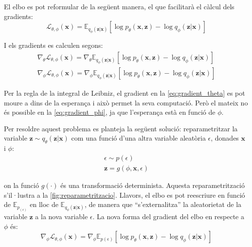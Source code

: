 \documentclass[CAT,BIB]{TFUOC}%
\begin{document}
        El \gls{elbo} es pot reformular de la següent manera,
        el que facilitarà el càlcul dels gradients:
        \begin{equation}
        \label{eq:elbo_2}
            \mathcal{L}_{\theta,\phi}(\mathbf{x}) =
            \mathbb{E}_{q_\phi(\mathbf{z|x})} [
                \log p_\theta(\mathbf{x,z}) -
                \log q_\phi(\mathbf{z|x})
            ]
        \end{equation}

        I els gradients es calculen segons:
        \begin{gather}
        \label{eq:gradient_theta}
            \nabla_\theta \mathcal{L}_{\theta,\phi}(\mathbf{x}) =
            \nabla_\theta \mathbb{E}_{q_\phi(\mathbf{z|x})} [
            \log p_\theta(\mathbf{x,z}) -
            \log q_\phi(\mathbf{z|x})
            ]
        \\
        \label{eq:gradient_phi}
            \nabla_\phi \mathcal{L}_{\theta,\phi}(\mathbf{x}) =
            \nabla_\phi \mathbb{E}_{q_\phi(\mathbf{z|x})} [
            \log p_\theta(\mathbf{x,z}) -
            \log q_\phi(\mathbf{z|x})
            ]
        \end{gather}

        Per la regla de la integral de Leibniz, el gradient en la \cref{eq:gradient_theta} es pot moure a dins de la esperança i això permet la seva computació. Però el mateix no és possible en la \cref{eq:gradient_phi}, ja que l'esperança està en funció de $\phi$.

        Per resoldre aquest problema es planteja la següent solució:
        reparametritzar la variable $\mathbf{z} \sim q_\theta(\mathbf{z|x})$
        com una funció d'una altra variable aleatòria $\epsilon$, donades $\mathbf{x}$ i $\phi$:
        \begin{gather}
        \label{eq:epsilon}
            \epsilon \sim p(\epsilon) \\
        \label{eq:z_reparam}
            \mathbf{z} = g(\phi, \mathbf{x}, \epsilon)
        \end{gather}

        on la funció $g(\cdot)$ és una transformació determinista.
        Aquesta reparametrització s'il·lustra a la \cref{fig:reparametritzacio}.
        Llavors, el \gls{elbo} es pot reescriure
        en funció de $\mathbb{E}_{p_(\epsilon)}$
        en lloc de $\mathbb{E}_{q_\phi(\mathbf{z|x})}$,
        de manera que ``s'externalitza'' la aleatorietat de la variable $\mathbf{z}$
        a la nova variable $\epsilon$.
        La nova forma del gradient del \gls{elbo} en respecte a $\phi$ és:
        \begin{equation}
        \label{eq:gradient_phi_reparam}
            \nabla_\phi \mathcal{L}_{\theta,\phi}(\mathbf{x}) =
            \nabla_\phi \mathbb{E}_{p(\epsilon)} [
                \log p_\theta(\mathbf{x,z}) -
                \log q_\phi(\mathbf{z|x})
            ]
        \end{equation}
\end{document}
